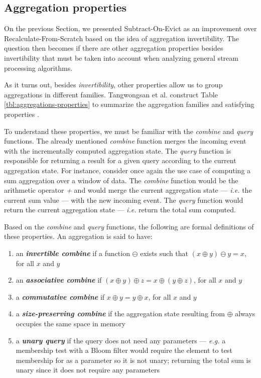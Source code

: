 \subsection{Aggregation properties}
\label{sec:agg-properties}

On the previous Section, we presented Subtract-On-Evict as an improvement over Recalculate-From-Scratch based on the idea of aggregation invertibility. The question then becomes if there are other aggregation properties besides invertibility that must be taken into account when analyzing general stream processing algorithms.

As it turns out, besides \textit{invertibility}, other properties allow us to group aggregations in different families. Tangwongsan et al. construct Table \ref{tbl:aggregations-properties} to summarize the aggregation families and satisfying properties \cite{Tangwongsan-Sliding-Window-Aggregation-Algorithms}.

To understand these properties, we must be familiar with the \textit{combine} and \textit{query} functions. The already mentioned \textit{combine} function merges the incoming event with the incrementally computed aggregation state. The \textit{query} function is responsible for returning a result for a given query according to the current aggregation state. For instance, consider once again the use case of computing a sum aggregation over a window of data. The \textit{combine} function would be the arithmetic operator \textit{+} and would merge the current aggregation state --- \textit{i.e.} the current sum value --- with the new incoming event. The \textit{query} function would return the current aggregation state --- \textit{i.e.} return the total sum computed.


Based on the \textit{combine} and \textit{query} functions, the following are formal definitions of these properties. An aggregation is said to have:

\begin{enumerate}
    \item  an \textbf{\textit{invertible combine}} if a function $\ominus$ exists such that $(x \oplus y) \ominus y = x$, for all $x$ and $y$
    
    \item  an \textbf{\textit{associative combine}} if $(x \oplus y) \oplus z = x \oplus (y \oplus z)$, for all $x$ and $y$
    
    \item  a \textbf{\textit{commutative combine}} if $x \oplus y = y \oplus x$, for all $x$ and $y$
    
    \item  a \textbf{\textit{size-preserving combine}} if the aggregation state resulting from $\oplus$ always occupies the same space in memory
   
    \item  a \textbf{\textit{unary query}} if the query does not need any parameters --- \textit{e.g.} a membership test with a Bloom filter would require the element to test membership for as a parameter so it is not unary; returning the total sum is unary since it does not require any parameters
\end{enumerate}

